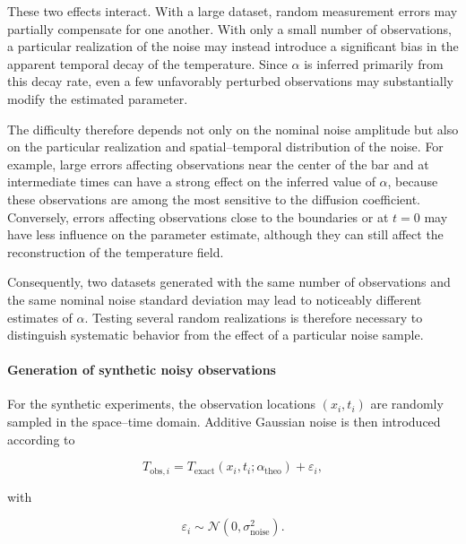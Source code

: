 These two effects interact. With a large dataset, random measurement errors may
partially compensate for one another. With only a small number of observations,
a particular realization of the noise may instead introduce a significant bias
in the apparent temporal decay of the temperature. Since $\alpha$ is inferred
primarily from this decay rate, even a few unfavorably perturbed observations
may substantially modify the estimated parameter.

The difficulty therefore depends not only on the nominal noise amplitude but
also on the particular realization and spatial--temporal distribution of the
noise. For example, large errors affecting observations near the center of the
bar and at intermediate times can have a strong effect on the inferred value of
$\alpha$, because these observations are among the most sensitive to the
diffusion coefficient. Conversely, errors affecting observations close to the
boundaries or at $t=0$ may have less influence on the parameter estimate,
although they can still affect the reconstruction of the temperature field.

Consequently, two datasets generated with the same number of observations and
the same nominal noise standard deviation may lead to noticeably different
estimates of $\alpha$. Testing several random realizations is therefore
necessary to distinguish systematic behavior from the effect of a particular
noise sample.

\paragraph{Generation of synthetic noisy observations}

For the synthetic experiments, the observation locations $(x_i,t_i)$ are
randomly sampled in the space--time domain. Additive Gaussian noise is then
introduced according to

\begin{equation}
T_{\mathrm{obs},i}
=
T_{\mathrm{exact}}(x_i,t_i;\alpha_{\mathrm{theo}})
+
\varepsilon_i,
\end{equation}

with

\begin{equation}
\varepsilon_i
\sim
\mathcal{N}
\left(
0,\sigma_{\mathrm{noise}}^2
\right).
\end{equation}

